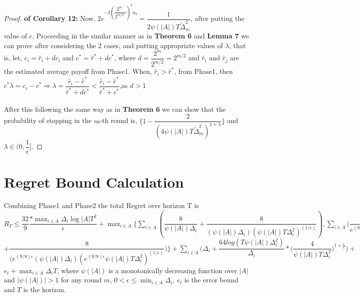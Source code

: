 \begin{proof}\textbf{ of Corollary 12:}
Now, $ 2e^{-2(\dfrac{2^{m}}{2^{m/2}}c)^{2} n_{b}} = \dfrac{1}{2\psi(|A|)T\tilde{\Delta}_{m}^{2}}$, after putting the value of $c$. Proceeding in the similar manner as in \textbf{Theorem 6} and \textbf{Lemma 7} we can prove after considering the 2 cases, and putting appropriate values of $\lambda$, that is,
\newline
let, $c_{i}= \hat{r}_{i} + dc_{i}$ and
$c^{*}= \hat{r}^{*} + dc^{*}$, where $d=\dfrac{2^{m}}{2^{m/2}}=2^{m/2}$ and $\hat{r}_{i}$ and $\hat{r}_{j}$ are the estimated average payoff from Phase1.
\newline
When, $\hat{r}_{i}>\hat{r}^{*}$, from Phase1, then
\newline
\hspace*{8em}$c^{*}\lambda=c_{i}-c^{*}\Rightarrow \lambda=\dfrac{\hat{r}_{i}-\hat{r}^{*}}{\hat{r}^{*}+dc^{*}}< \dfrac{\hat{r}_{i}-\hat{r}^{*}}{\hat{r}^{*}+c^{*}} $,as $d>1$
\newline
\paragraph*{}After this following the same way as in \textbf{Theorem 6} we can show that the probability of stopping in the $m$-th round is, $\bigg\lbrace 1-\dfrac{2}{(4\psi(|A|)T\tilde{\Delta}_{m}^{2})^{1+\lambda}}\bigg\rbrace$ and $\lambda\in (0,\dfrac{1}{\epsilon}]$.
\end{proof}

\section{Regret Bound Calculation}

\begin{theorem}
Combining Phase1 and Phase2 the total Regret over horizon T is $R_{T}\leq \dfrac{32}{9}\dfrac{ * \max_{i\in A}{\Delta}_{i} \log |A|T^{2}}{\epsilon} + \max_{i\in A}\bigg\lbrace\sum_{i\in A} (\dfrac{8}{\psi(|A|)\Delta_{i}} + \dfrac{8}{(\psi(|A|)\Delta_{i})(\psi(|A|)T\Delta_{i}^{2})^{(1/\epsilon)}}), \sum_{i\in A}(\dfrac{8}{ e^{(9/8)\epsilon} \psi(|A|)\Delta_{i}}$
\newline $+\dfrac{8}{(e^{(9/8)\epsilon}(\psi(|A|)\Delta_{i})(e^{(9/8)\epsilon} \psi(|A|)T\Delta_{i}^{2})^{(1/\epsilon)}})\bigg\rbrace + \sum_{i\in A}\bigg(\Delta_{i} + \dfrac{64log({T\psi(|A|)\Delta_{i}^{2}})}{\Delta_{i}}*\bigg(\dfrac{4}{\psi(|A|)T\Delta_{i}^{2}}\bigg)^{1+\frac{1}{\epsilon}}\bigg) + $\newline\newline$ e_{t} + \max_{i\in A}\Delta_{i}T$, 
where $\psi(|A|)$ is a monotonically decreasing function over $|A|$ and $|\psi(|A|)|>1$ for any round $m$, $0<\epsilon\leq \min_{i\in A}{\Delta_{i}}$, $e_{t}$ is the error bound and $T$ is the horizon.
\end{theorem}


